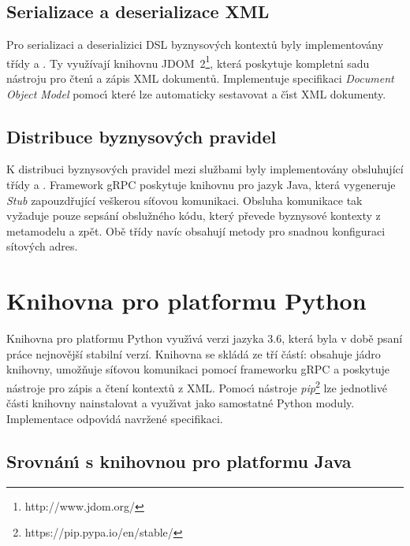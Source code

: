 \subsection{Serializace a deserializace XML}

Pro serializaci a deserializici \gls{DSL} byznysových kontextů byly implementovány třídy
 a . Ty využívají knihovnu
JDOM~2\footnote{http://www.jdom.org/}, která poskytuje
kompletn\'{\i} sadu nástroju pro čten\'{\i} a zápis \gls{XML} dokumentů.
Implementuje specifikaci \textit{Document Object Model}
pomoc\'{\i} které lze automaticky sestavovat a č\'{\i}st \gls{XML} dokumenty.

\subsection{Distribuce byznysových pravidel}

K distribuci byznysových pravidel mezi službami byly implementovány obsluhující třídy
 a .
Framework gRPC poskytuje knihovnu pro jazyk Java, která vygeneruje \textit{Stub}
zapouzdřující veškerou síťovou komunikaci. Obsluha komunikace tak vyžaduje pouze
sepsání obslužného kódu, který převede byznysové kontexty z metamodelu a zpět.
Obě třídy navíc obsahují metody pro snadnou konfiguraci sítových adres.

\section{Knihovna pro platformu Python}

Knihovna pro platformu Python využ\'{\i}vá verzi jazyka 3.6, která byla v době
psaní práce nejnovější stabilní verzí. Knihovna se skládá ze tří částí:  obsahuje jádro knihovny,
 umožňuje síťovou komunikaci pomocí frameworku
gRPC a  poskytuje nástroje pro zápis a čtení kontextů z \gls{XML}.
Pomoc\'{\i} nástroje \textit{pip}\footnote{https://pip.pypa.io/en/stable/}
lze jednotlivé části knihovny nainstalovat a využ\'{\i}vat jako samostatné
Python moduly. Implementace odpov\'{\i}dá navržené specifikaci.

\subsection{Srovnán\'{\i} s knihovnou pro platformu Java}

